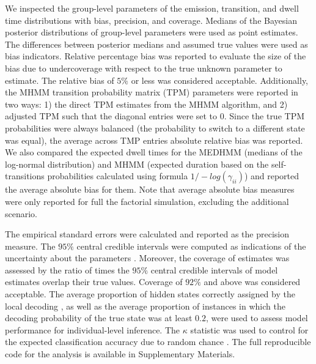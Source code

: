 We inspected the group-level parameters of the emission, transition, and dwell time distributions with bias, precision, and coverage. Medians of the Bayesian posterior distributions of group-level parameters were used as point estimates. The differences between posterior medians and assumed true values were used as bias indicators. Relative percentage bias was reported to evaluate the size of the bias due to undercoverage with respect to the true unknown parameter to estimate. The relative bias of $5\%$ or less was considered acceptable. Additionally, the MHMM transition probability matrix (TPM) parameters were reported in two ways: 1) the direct TPM estimates from the MHMM algorithm, and 2) adjusted TPM such that the diagonal entries were set to 0. Since the true TPM probabilities were always balanced (the probability to switch to a different state was equal), the average across TMP entries absolute relative bias was reported. We also compared the expected dwell times for the MEDHMM (medians of the log-normal distribution) and MHMM (expected duration based on the self-transitions probabilities calculated using formula $1/-log(\gamma_{ii})$) and reported the average absolute bias for them. Note that average absolute bias measures were only reported for full the factorial simulation, excluding the additional scenario. 

The empirical standard errors were calculated and reported as the precision measure. The $95\%$ central credible intervals were computed as indications of the uncertainty about the parameters \citep{Lynch_2007}. Moreover, the coverage of estimates was assessed by the ratio of times the $95\%$ central credible intervals of model estimates overlap their true values. Coverage of $92\%$ and above was considered acceptable. The average proportion of hidden states correctly assigned by the local decoding \citep{Scott_2002}, as well as the average proportion of instances in which the decoding probability of the true state was at least $0.2$, were used to assess model performance for individual-level inference. The $\kappa$ statistic was used to control for the expected classification accuracy due to random chance \citep{Cohen_1960}.
The full reproducible code for the analysis is available in Supplementary Materials.

